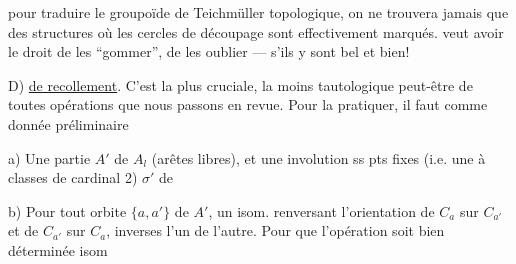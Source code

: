pour  traduire le groupoïde de Teichmüller topologique, on ne trouvera jamais que des structures où les cercles de découpage sont effectivement marqués.
 veut avoir le droit de les ``gommer'', de les oublier  ---  s'ils y sont bel et bien!

D) \uline{ de recollement}. C'est la plus cruciale, la moins tautologique peut-être de toutes  opérations que nous passons en revue.
Pour la pratiquer, il faut comme donnée préliminaire

a) Une partie  $A'$ de $A_l$ (arêtes libres), et une involution ss pts fixes (i.e. une   à classes de cardinal 2) $\sigma'$ de  

b) Pour  tout orbite  $\{a,a'\}$ de $A'$, un isom. renversant l'orientation de $C_a$ sur $C_{a'}$ et de $C_{a'}$ sur $C_a$, inverses l'un de l'autre.
Pour que l'opération soit bien déterminée  isom 
